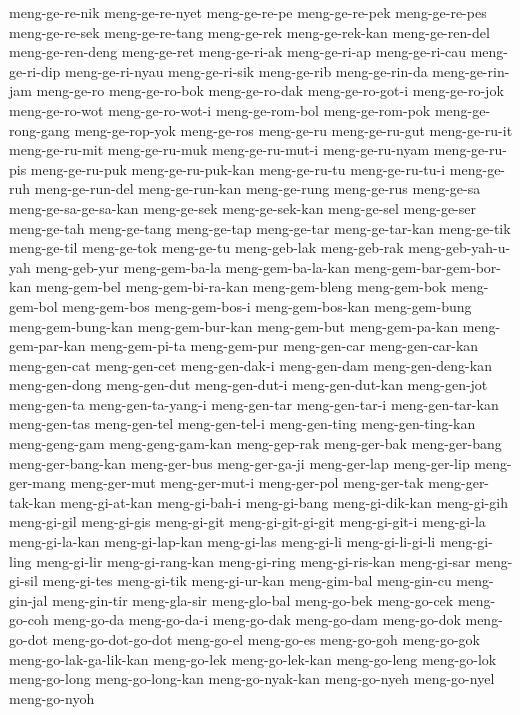 {meng-ge-re-nik meng-ge-re-nyet meng-ge-re-pe meng-ge-re-pek meng-ge-re-pes
meng-ge-re-sek meng-ge-re-tang meng-ge-rek meng-ge-rek-kan meng-ge-ren-del
meng-ge-ren-deng meng-ge-ret meng-ge-ri-ak meng-ge-ri-ap meng-ge-ri-cau
meng-ge-ri-dip meng-ge-ri-nyau meng-ge-ri-sik meng-ge-rib meng-ge-rin-da
meng-ge-rin-jam meng-ge-ro meng-ge-ro-bok meng-ge-ro-dak meng-ge-ro-got-i
meng-ge-ro-jok meng-ge-ro-wot meng-ge-ro-wot-i meng-ge-rom-bol
meng-ge-rom-pok meng-ge-rong-gang meng-ge-rop-yok meng-ge-ros meng-ge-ru
meng-ge-ru-gut meng-ge-ru-it meng-ge-ru-mit meng-ge-ru-muk
meng-ge-ru-mut-i meng-ge-ru-nyam meng-ge-ru-pis meng-ge-ru-puk
meng-ge-ru-puk-kan meng-ge-ru-tu meng-ge-ru-tu-i meng-ge-ruh
meng-ge-run-del meng-ge-run-kan meng-ge-rung meng-ge-rus meng-ge-sa
meng-ge-sa-ge-sa-kan meng-ge-sek meng-ge-sek-kan meng-ge-sel meng-ge-ser
meng-ge-tah meng-ge-tang meng-ge-tap meng-ge-tar meng-ge-tar-kan
meng-ge-tik meng-ge-til meng-ge-tok meng-ge-tu meng-geb-lak meng-geb-rak
meng-geb-yah-u-yah meng-geb-yur meng-gem-ba-la meng-gem-ba-la-kan
meng-gem-bar-gem-bor-kan meng-gem-bel meng-gem-bi-ra-kan meng-gem-bleng
meng-gem-bok meng-gem-bol meng-gem-bos meng-gem-bos-i meng-gem-bos-kan
meng-gem-bung meng-gem-bung-kan meng-gem-bur-kan meng-gem-but
meng-gem-pa-kan meng-gem-par-kan meng-gem-pi-ta meng-gem-pur meng-gen-car
meng-gen-car-kan meng-gen-cat meng-gen-cet meng-gen-dak-i meng-gen-dam
meng-gen-deng-kan meng-gen-dong meng-gen-dut meng-gen-dut-i
meng-gen-dut-kan meng-gen-jot meng-gen-ta meng-gen-ta-yang-i meng-gen-tar
meng-gen-tar-i meng-gen-tar-kan meng-gen-tas meng-gen-tel meng-gen-tel-i
meng-gen-ting meng-gen-ting-kan meng-geng-gam meng-geng-gam-kan
meng-gep-rak meng-ger-bak meng-ger-bang meng-ger-bang-kan meng-ger-bus
meng-ger-ga-ji meng-ger-lap meng-ger-lip meng-ger-mang meng-ger-mut
meng-ger-mut-i meng-ger-pol meng-ger-tak meng-ger-tak-kan meng-gi-at-kan
meng-gi-bah-i meng-gi-bang meng-gi-dik-kan meng-gi-gih meng-gi-gil
meng-gi-gis meng-gi-git meng-gi-git-gi-git meng-gi-git-i meng-gi-la
meng-gi-la-kan meng-gi-lap-kan meng-gi-las meng-gi-li meng-gi-li-gi-li
meng-gi-ling meng-gi-lir meng-gi-rang-kan meng-gi-ring meng-gi-ris-kan
meng-gi-sar meng-gi-sil meng-gi-tes meng-gi-tik meng-gi-ur-kan
meng-gim-bal meng-gin-cu meng-gin-jal meng-gin-tir meng-gla-sir
meng-glo-bal meng-go-bek meng-go-cek meng-go-coh meng-go-da meng-go-da-i
meng-go-dak meng-go-dam meng-go-dok meng-go-dot meng-go-dot-go-dot
meng-go-el meng-go-es meng-go-goh meng-go-gok meng-go-lak-ga-lik-kan
meng-go-lek meng-go-lek-kan meng-go-leng meng-go-lok meng-go-long
meng-go-long-kan meng-go-nyak-kan meng-go-nyeh meng-go-nyel meng-go-nyoh
}

